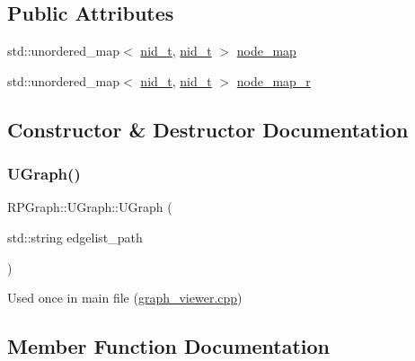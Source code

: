 \subsection*{Public Attributes}
\begin{DoxyCompactItemize}
\item 
std\+::unordered\+\_\+map$<$ \mbox{\hyperlink{namespaceRPGraph_ab3ae34f1ab88e48f43794c30c8697b74}{nid\+\_\+t}}, \mbox{\hyperlink{namespaceRPGraph_ab3ae34f1ab88e48f43794c30c8697b74}{nid\+\_\+t}} $>$ \mbox{\hyperlink{classRPGraph_1_1UGraph_a084f2f04bcf93eb362fbf1d275a1c018}{node\+\_\+map}}
\item 
std\+::unordered\+\_\+map$<$ \mbox{\hyperlink{namespaceRPGraph_ab3ae34f1ab88e48f43794c30c8697b74}{nid\+\_\+t}}, \mbox{\hyperlink{namespaceRPGraph_ab3ae34f1ab88e48f43794c30c8697b74}{nid\+\_\+t}} $>$ \mbox{\hyperlink{classRPGraph_1_1UGraph_a688250d7d12a6a901325a4ee7b3b518d}{node\+\_\+map\+\_\+r}}
\end{DoxyCompactItemize}


\subsection{Constructor \& Destructor Documentation}
\mbox{\label{classRPGraph_1_1UGraph_a2e52cd7b17ae1f839b45e26ec6ae1135}} 
\subsubsection{\texorpdfstring{U\+Graph()}{UGraph()}}
{\footnotesize\ttfamily R\+P\+Graph\+::\+U\+Graph\+::\+U\+Graph (\begin{DoxyParamCaption}\item[{std\+::string}]{edgelist\+\_\+path }\end{DoxyParamCaption})}

Used once in main file (\mbox{\hyperlink{graph__viewer_8cpp}{graph\+\_\+viewer.\+cpp}}) 

\subsection{Member Function Documentation}
\mbox{\label{classRPGraph_1_1UGraph_a4d3c3af1ba4787ef5ced5f5efa9d05cf}} 
